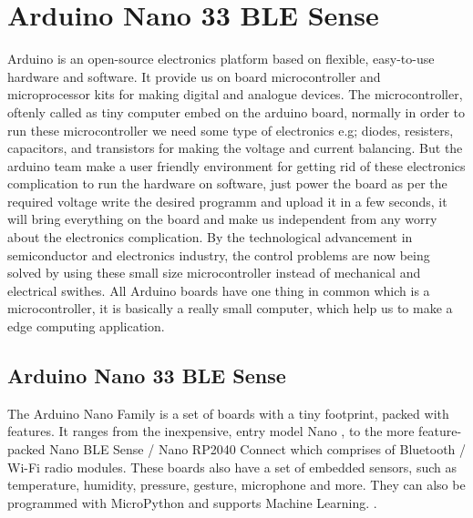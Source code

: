 %
%
%








\chapter{Arduino Nano 33 BLE Sense}


Arduino is an open-source electronics platform based on flexible, easy-to-use hardware and software. It provide us on board microcontroller and microprocessor kits for making digital and analogue devices. The microcontroller, oftenly called as tiny computer embed on the arduino board, normally in order to run these microcontroller we need some type of electronics e.g; diodes, resisters, capacitors, and transistors for making the voltage and current balancing. But the arduino team make a user friendly environment for getting rid of these electronics complication to run the hardware on software, just power the board as per the required voltage write the desired programm and upload it in a few seconds, it will bring everything on the board and  make us independent from any worry about the electronics complication. By the technological advancement in semiconductor and electronics  industry, the  control problems are now being solved by using these small size microcontroller instead of mechanical and electrical swithes. All Arduino boards have one thing in common which is a microcontroller, it is basically a really small computer, which help us to make a edge computing application.\cite{Arduino:2021b}

\section{Arduino Nano 33 BLE Sense}

The Arduino Nano Family is a set of boards with a tiny footprint, packed with features. It ranges from the inexpensive, entry model Nano , to the more feature-packed Nano BLE Sense / Nano RP2040 Connect which comprises of Bluetooth / Wi-Fi radio modules. These boards also have a set of embedded sensors, such as temperature, humidity, pressure, gesture, microphone and more. They can also be programmed with MicroPython and supports Machine Learning. \cite{Raj:2019}.

